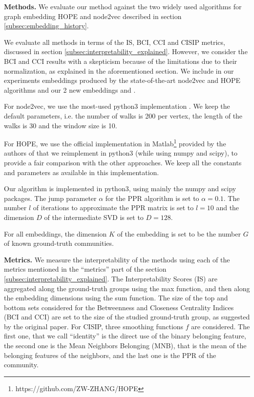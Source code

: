 \noindent\textbf{Methods.} 
We evaluate our method against the two widely used algorithms for graph embedding HOPE and node2vec described in section \ref{subsec:embedding_history}.

We evaluate all methods in terms of the IS, BCI, CCI and CISIP metrics, discussed in section \ref{subsec:interpretability_explained}. However, we consider the BCI and CCI results with a skepticism because of the limitations due to their normalization, as explained in the aforementioned section.
We include in our experiments embeddings produced by the state-of-the-art node2vec and HOPE algorithms and our 2 new embeddings \newembLeft{} and \newembRight{}.

For node2vec, we use the most-used python3 implementation \cite{node2vec_impl}. We keep the default parameters, i.e. the number of walks is 200 per vertex, the length of the walks is 30 and the window size is 10.

For HOPE, we use the official implementation in Matlab\footnote{https://github.com/ZW-ZHANG/HOPE} provided by the authors of \cite{HOPE} that we reimplement in python3 (while using numpy and scipy), to provide a fair comparison with the other approaches. We keep all the constants and parameters as available in this implementation.

Our algorithm is implemented in python3, using mainly the numpy \cite{numpy} and scipy \cite{scipy} packages. The jump parameter $\alpha$ for the PPR algorithm is set to $\alpha=0.1$. The number $l$ of iterations to approximate the PPR matrix is set to $l=10$ and the dimension $D$ of the intermediate SVD is set to $D=128$.

For all embeddings, %
the dimension $K$ of the embedding is set to be the number $G$ of known ground-truth communities.

\noindent\textbf{Metrics.} We measure the interpretability of the methods using each of the metrics mentioned in the “metrics” part of the section \ref{subsec:interpretability_explained}. The Interpretability Scores (IS) are aggregated along the ground-truth groups using the max function, and then along the embedding dimensions using the sum function.
The size of the top and bottom sets considered for the Betweenness and Closeness Centrality Indices (BCI and CCI) are set to the size of the studied ground-truth group, as suggested by the original paper.
For CISIP, three smoothing functions $f$ are considered. The first one, that we call “identity” is the direct use of the binary belonging feature, the second one is the Mean Neighbors Belonging (MNB), that is the mean of the belonging features of the neighbors, and the last one is the PPR of the community.

